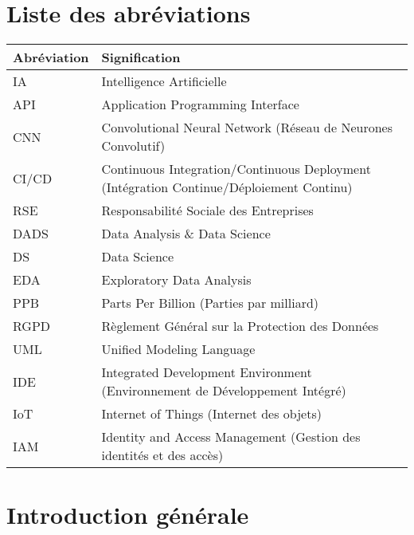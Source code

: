 \documentclass[12pt,a4paper]{report}
\begin{document}
\cleardoublepage
{}
\chapter*{Liste des abréviations}
\begin{tabularx}{\textwidth}{lX}
    \toprule
    \textbf{Abréviation} & \textbf{Signification} \\
    \midrule
    IA & Intelligence Artificielle \\
    API & Application Programming Interface \\
    CNN & Convolutional Neural Network (Réseau de Neurones Convolutif) \\
    CI/CD & Continuous Integration/Continuous Deployment (Intégration Continue/Déploiement Continu) \\
    RSE & Responsabilité Sociale des Entreprises \\
    DADS & Data Analysis \& Data Science \\
    DS & Data Science \\
    EDA & Exploratory Data Analysis \\
    PPB & Parts Per Billion (Parties par milliard) \\
    RGPD & Règlement Général sur la Protection des Données \\
    UML & Unified Modeling Language \\
    IDE & Integrated Development Environment (Environnement de Développement Intégré) \\
    IoT & Internet of Things (Internet des objets) \\
    IAM & Identity and Access Management (Gestion des identités et des accès) \\
    \bottomrule
\end{tabularx}
\cleardoublepage


\tableofcontents
\cleardoublepage
{}
\listoffigures
\cleardoublepage

\setcounter{page}{1}
\chapter*{Introduction générale}
\end{document}

